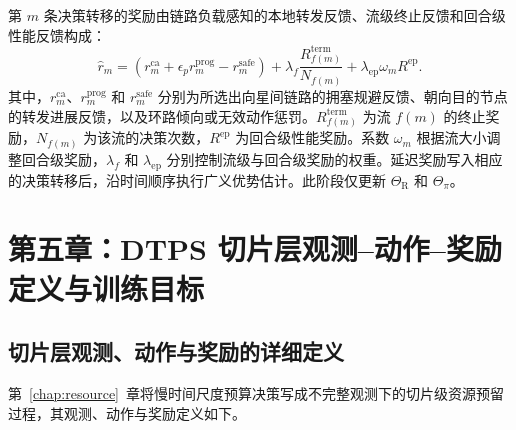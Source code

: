 第 $m$ 条决策转移的奖励由链路负载感知的本地转发反馈、流级终止反馈和回合级性能反馈构成：
\begin{equation}
\hat r_m
=
\left(
r_m^{\mathrm{ca}}
+
\epsilon_p r_m^{\mathrm{prog}}
-
r_m^{\mathrm{safe}}
\right)
+
\lambda_f \frac{R_{f(m)}^{\mathrm{term}}}{N_{f(m)}}
+
\lambda_{\mathrm{ep}} \omega_m R^{\mathrm{ep}} .
\label{eq:app_ch3_decision_reward}
\end{equation}
其中，$r_m^{\mathrm{ca}}$、$r_m^{\mathrm{prog}}$ 和 $r_m^{\mathrm{safe}}$ 分别为所选出向星间链路的拥塞规避反馈、朝向目的节点的转发进展反馈，以及环路倾向或无效动作惩罚。$R_{f(m)}^{\mathrm{term}}$ 为流 $f(m)$ 的终止奖励，$N_{f(m)}$ 为该流的决策次数，$R^{\mathrm{ep}}$ 为回合级性能奖励。系数 $\omega_m$ 根据流大小调整回合级奖励，$\lambda_f$ 和 $\lambda_{\mathrm{ep}}$ 分别控制流级与回合级奖励的权重。延迟奖励写入相应的决策转移后，沿时间顺序执行广义优势估计。此阶段仅更新 $\Theta_{\mathrm R}$ 和 $\Theta_\pi$。

\chapter{第五章：DTPS 切片层观测--动作--奖励定义与训练目标}

\section{切片层观测、动作与奖励的详细定义}
\label{app:ch5_obs_action_reward}

第~\ref{chap:resource}~章将慢时间尺度预算决策写成不完整观测下的切片级资源预留过程，其观测、动作与奖励定义如下。


